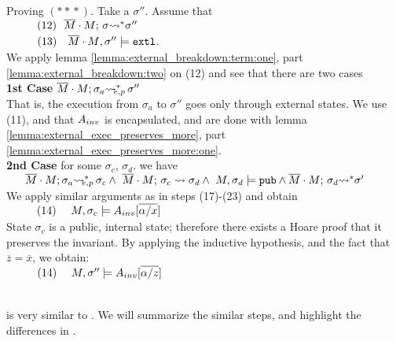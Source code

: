 \begin{description}
 \vspace{.3cm}

Proving   $(*\!*\!*)$. Take a $\sigma''$. Assume that\\
$\SPS (12) \ \ \leadstoBoundedStar   {\Mtwo\cdot M}  {\sigma}  {\sigma''}$\\
$\strut \ \ \hspace{0.5cm} \ \  (13) \ \ \ {\overline{M}\cdot M}, \sigma'' \models \mbox{\normalfont{\texttt{extl}}}$.\\
We apply lemma \ref{lemma:external_breakdown:term:one}, part \ref{lemma:external_breakdown:two}
on (12) and see that there are two cases\\
\textbf{1st Case} $\overline{M}\cdot M; \sigma_a {\rightsquigarrow^*}\!\!\!\!_{e,p}\, \sigma''$\\
That is, the execution from $\sigma_a$ to $\sigma''$ goes only through external states. 
We use (11), and that 
 $A_{inv}$ is encapsulated, and are done with lemma \ref{lemma:external_exec_preserves_more}, part 
 \ref{lemma:external_exec_preserves_more:one}.
\\
\textbf{2nd Case} for some  $\sigma_c$, $\sigma_d.$ we have\\
$
\strut \ \ \ \ \ \overline{M}\cdot M; \sigma_a {\rightsquigarrow^*}\!\!\!\!_{e,p}\, \sigma_c 
\wedge\ \overline{M}\cdot M;\, {\sigma_c} \rightsquigarrow \sigma_d 
\wedge \ M, \sigma_d \models \mbox{\normalfont{\texttt{pub}}} \wedge \overline{M}\cdot M;\, {\sigma_d} {\rightsquigarrow^*} \sigma'$\\
We apply similar arguments as in steps (17)-(23) and obtain \\
$\strut \ \ \hspace{0.5cm} \ \  (14) \ \ \ \ {M, \sigma_c \models A_{inv}[\overline{\alpha/x} ]} $ 
\\
State $\sigma_c$ is a public, internal state;  therefore there exists a Hoare proof that it preserves the invariant.
By applying the inductive hypothesis, and the fact that $\overline z = \overline x$, we obtain:
\\
$\strut \ \ \hspace{0.5cm} \ \  (14) \ \ \ \ {M, \sigma'' \models A_{inv}[\overline{\alpha/z} ]} $
\\
~ \\

\item[{\sc{Call\_Ext\_Adapt\_Strong}}] is  very similar to {}.
We will summarize the similar steps, and highlight the differences in .


\end{description}
